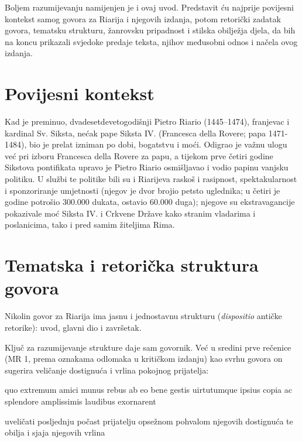 \documentclass[a5paper,twoside]{article}
\renewenvironment{quote}
               {\list{}{\rightmargin 0mm
                \leftmargin 7mm
                \itemindent 0em}%
                \item\relax}
               {\endlist}
\begin{document}
Boljem razumijevanju namijenjen je i ovaj uvod. Predstavit ću najprije povijesni kontekst samog govora za Riarija i njegovih izdanja, potom retorički zadatak govora, tematsku strukturu, žanrovsku pripadnost i stilska obilježja djela, da bih na koncu prikazali svjedoke predaje teksta, njihov međusobni odnos i načela ovog izdanja. 

\section{Povijesni kontekst}

Kad je preminuo, dvadesetdevetogodišnji Pietro Riario (1445–1474), franjevac i kardinal Sv. Siksta, nećak pape Siksta IV. (Francesca della Rovere; papa 1471-1484), bio je prelat izniman po dobi, bogatstvu i moći. Odigrao je važnu ulogu već pri izboru Francesca della Rovere za papu, a tijekom prve četiri godine Sikstova pontifikata upravo je Pietro Riario osmišljavao i vodio papinu vanjsku politiku. U službi te politike bili su i Riarijeva raskoš i rasipnost, spektakularnost i sponzoriranje umjetnosti (njegov je dvor brojio petsto uglednika; u četiri je godine potrošio 300.000 dukata, ostavio 60.000 duga); njegove su ekstravagancije pokazivale moć Siksta IV. i Crkvene Države kako stranim vladarima i poslanicima, tako i pred samim žiteljima Rima.


\section{Tematska i retorička struktura govora}

Nikolin govor za Riarija ima jasnu i jednostavnu strukturu (\textit{\textlatin{dispositio}} antičke retorike): uvod, glavni dio i završetak. 

Ključ za razumijevanje strukture daje sam govornik. Već u sredini prve rečenice (MR 1, prema oznakama odlomaka u kritičkom izdanju) kao svrhu govora on sugerira veličanje dostignuća i vrlina pokojnog prijatelja:

\begin{quote}
\begin{latin}
quo extremum amici munus rebus ab eo bene gestis uirtutumque ipsius copia ac splendore amplissimis laudibus exornarent
\end{latin}

uveličati posljednju počast prijatelju opsežnom pohvalom njegovih dostignuća te obilja i sjaja njegovih vrlina
\end{quote}
\end{document}
